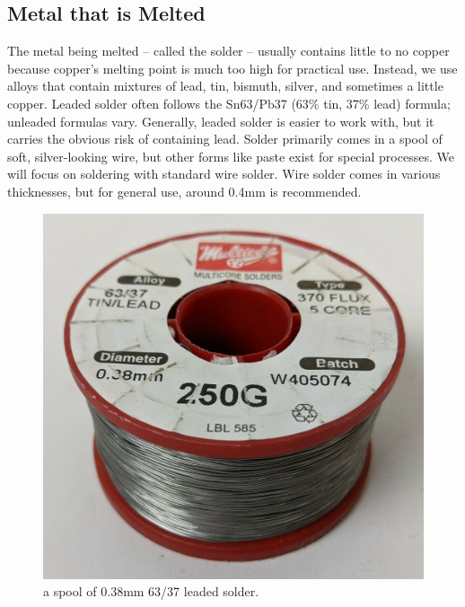 \subsection{Metal that is Melted}
The metal being melted – called the solder – usually contains little to no copper because copper’s melting point is much too high for practical use. Instead, we use alloys that contain mixtures of lead, tin, bismuth, silver, and sometimes a little copper. Leaded solder often follows the Sn63/Pb37 (63\% tin, 37\% lead) formula; unleaded formulas vary. Generally, leaded solder is easier to work with, but it carries the obvious risk of containing lead. Solder primarily comes in a spool of soft, silver-looking wire, but other forms like paste exist for special processes. We will focus on soldering with standard wire solder. Wire solder comes in various thicknesses, but for general use, around 0.4mm is recommended.
\begin{figure}[h]
    \caption{a spool of 0.38mm 63/37 leaded solder.}
    \centering \includegraphics[scale=0.25]{images/solder_spool.jpg}
\end{figure}

